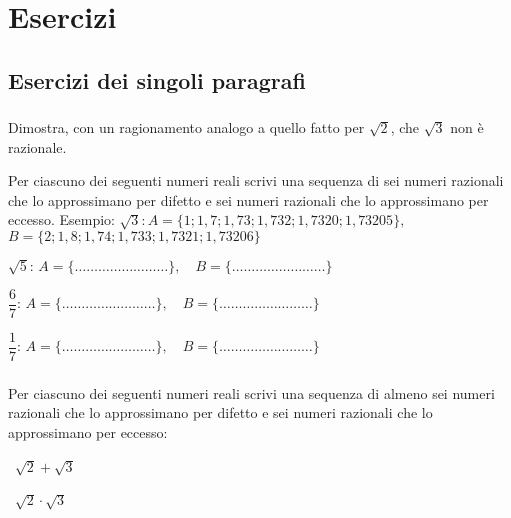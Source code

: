 
\section{Esercizi}

\subsection{Esercizi dei singoli paragrafi}

\subsubsection*{}

\begin{esercizio}
\label{ese:1.1}
Dimostra, con un ragionamento analogo a quello fatto per $\sqrt 2$, che 
$\sqrt 3$ non è razionale.
\end{esercizio}

\begin{esercizio}
\label{ese:1.2}
 Per ciascuno dei seguenti numeri reali scrivi una sequenza di sei numeri 
razionali che lo approssimano per difetto e sei numeri razionali che lo 
approssimano per eccesso. Esempio:
$\sqrt 3$:\,$A=\{1; 1,7; 1,73; 1,732; 1,7320; 1,73205\},$\,$B=\{2; 1,8; 
1,74; 1,733; 1,7321; 1,73206\}$
\begin{enumeratea}
 \item$\sqrt{5}:\, 
A=\{\ldots\ldots\ldots\ldots\ldots\ldots\ldots\ldots\},\quad 
B=\{\ldots\ldots\ldots\ldots\ldots\ldots\ldots\ldots\}$
 \item$\dfrac{6}{7}:\, 
A=\{\ldots\ldots\ldots\ldots\ldots\ldots\ldots\ldots\},\quad 
B=\{\ldots\ldots\ldots\ldots\ldots\ldots\ldots\ldots\}$
 \item$\dfrac{1}{7}:\, 
A=\{\ldots\ldots\ldots\ldots\ldots\ldots\ldots\ldots\},\quad 
B=\{\ldots\ldots\ldots\ldots\ldots\ldots\ldots\ldots\}$
\end{enumeratea}
\end{esercizio}

\subsubsection*{}

\begin{esercizio}
\label{ese:1.3}
 Per ciascuno dei seguenti numeri reali scrivi una sequenza di almeno sei 
numeri razionali che lo approssimano per difetto e sei numeri razionali che 
lo approssimano per eccesso:
\begin{multicols}{2}
\begin{enumeratea}
 \item~$\sqrt {2}+\sqrt {3}$
 \item~$\sqrt {2}\cdot\sqrt {3}$
\end{enumeratea}
\end{multicols}
\end{esercizio}

